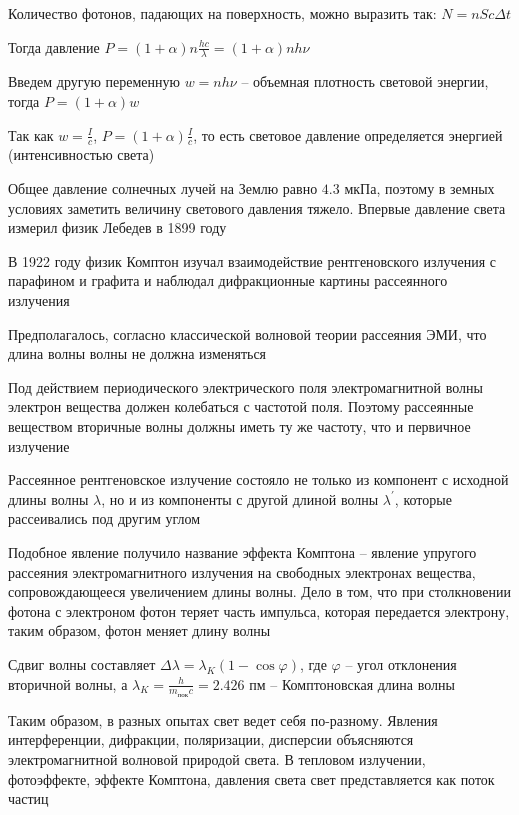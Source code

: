 Количество фотонов, падающих на поверхность, можно выразить так: $N = n S c \Delta t$

Тогда давление $P = (1 + \alpha) n \frac{h c}{\lambda} = (1 + \alpha) n h \nu$

Введем другую переменную $w = n h \nu$ -- объемная плотность световой энергии, тогда $P = (1 + \alpha) w$

Так как $w = \frac{I}{c}$, $P = (1 + \alpha) \frac{I}{c}$, то есть световое давление определяется энергией (интенсивностью света)

Общее давление солнечных лучей на Землю равно $4.3$ мкПа, поэтому в земных условиях заметить величину светового давления тяжело. Впервые давление света измерил физик Лебедев в 1899 году

\mediumvspace

В 1922 году физик Комптон изучал взаимодействие рентгеновского излучения с парафином и графита и наблюдал дифракционные картины рассеянного излучения

Предполагалось, согласно классической волновой теории рассеяния ЭМИ, что длина волны волны не должна изменяться

Под действием периодического электрического поля электромагнитной волны электрон вещества должен колебаться с частотой поля. Поэтому рассеянные веществом вторичные волны должны иметь ту же частоту, что и первичное излучение


Рассеянное рентгеновское излучение состояло не только из компонент с исходной длины волны $\lambda$, но и из компоненты с другой длиной волны $\lambda^\prime$, которые рассеивались под другим углом

Подобное явление получило название эффекта Комптона -- явление упругого рассеяния электромагнитного излучения на свободных электронах вещества, сопровождающееся увеличением длины волны. Дело в том, что при столкновении фотона с электроном фотон теряет часть импульса, которая передается электрону, таким образом, фотон меняет длину волны

Сдвиг волны составляет $\Delta \lambda = \lambda_K (1 - \cos\varphi)$, где $\varphi$ -- угол отклонения вторичной волны, а $\lambda_K = \frac{h}{m_{\text{пок}} c} = 2.426$ пм -- Комптоновская длина волны

\mediumvspace

Таким образом, в разных опытах свет ведет себя по-разному. Явления интерференции, дифракции, поляризации, дисперсии объясняются электромагнитной волновой природой света. В тепловом излучении, фотоэффекте, эффекте Комптона, давления света свет представляется как поток частиц

